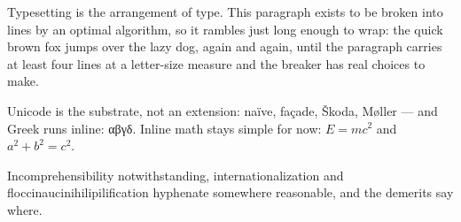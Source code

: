 \documentclass{article}
\begin{document}
Typesetting is the arrangement of type. This paragraph exists to be broken
into lines by an optimal algorithm, so it rambles just long enough to wrap:
the quick brown fox jumps over the lazy dog, again and again, until the
paragraph carries at least four lines at a letter-size measure and the
breaker has real choices to make.

Unicode is the substrate, not an extension: naïve, façade, Škoda, Møller —
and Greek runs inline: αβγδ. Inline math stays simple for now: $E = mc^2$
and $a^2 + b^2 = c^2$.

Incomprehensibility notwithstanding, internationalization and
floccinaucinihilipilification hyphenate somewhere reasonable, and the
demerits say where.
\end{document}
